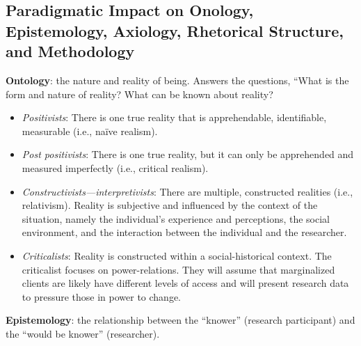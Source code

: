 \documentclass[
  english,
]{book}
\providecommand{\tightlist}{%
  \setlength{\itemsep}{0pt}\setlength{\parskip}{0pt}}
\begin{document}
\hypertarget{paradigmatic-impact-on-onology-epistemology-axiology-rhetorical-structure-and-methodology}{%
\subsection{Paradigmatic Impact on Onology, Epistemology, Axiology, Rhetorical Structure, and Methodology}\label{paradigmatic-impact-on-onology-epistemology-axiology-rhetorical-structure-and-methodology}}

\textbf{Ontology}: the nature and reality of being. Answers the questions, ``What is the form and nature of reality? What can be known about reality?

\begin{itemize}
\tightlist
\item
  \emph{Positivists}: There is one true reality that is apprehendable, identifiable, measurable (i.e., naïve realism).
\item
  \emph{Post positivists}: There is one true reality, but it can only be apprehended and measured imperfectly (i.e., critical realism).
\item
  \emph{Constructivists---interpretivists}: There are multiple, constructed realities (i.e., relativism). Reality is subjective and influenced by the context of the situation, namely the individual's experience and perceptions, the social environment, and the interaction between the individual and the researcher.
\item
  \emph{Criticalists}: Reality is constructed within a social-historical context. The criticalist focuses on power-relations. They will assume that marginalized clients are likely have different levels of access and will present research data to pressure those in power to change.
\end{itemize}

\textbf{Epistemology}: the relationship between the ``knower'' (research participant) and the ``would be knower'' (researcher).
\end{document}
